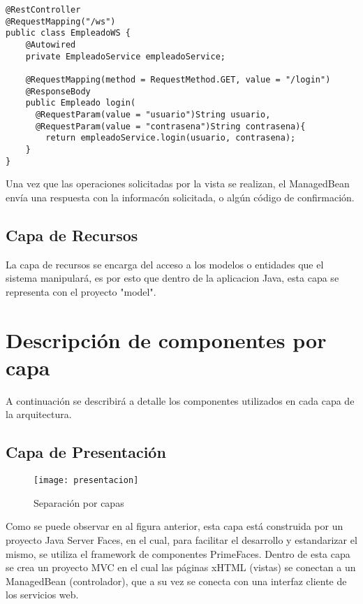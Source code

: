 \begin{lstlisting}
@RestController
@RequestMapping("/ws")
public class EmpleadoWS {
    @Autowired
    private EmpleadoService empleadoService;
    
    @RequestMapping(method = RequestMethod.GET, value = "/login")
    @ResponseBody
    public Empleado login(
      @RequestParam(value = "usuario")String usuario,
      @RequestParam(value = "contrasena")String contrasena){
        return empleadoService.login(usuario, contrasena);
    }
}
\end{lstlisting}
Una vez que las operaciones solicitadas por la vista se realizan, el ManagedBean envía una respuesta con la informacón solicitada, o algún código de confirmación.

\subsection{Capa de Recursos}
La capa de recursos se encarga del acceso a los modelos o entidades que el sistema manipulará, es por esto que dentro de la aplicacion Java, esta capa se representa con el proyecto "model".

\section{Descripción de componentes por capa}

A continuación se describirá a detalle los componentes utilizados en cada capa de la arquitectura.

\subsection{Capa de Presentación}

\begin{figure}[H]
  \begin{center}
    \texttt{[image: presentacion]}
  \end{center}
  \caption{Separación por capas}
\end{figure}

Como se puede observar en al figura anterior, esta capa está construida por un proyecto Java Server Faces, en el cual, para facilitar el desarrollo y estandarizar el mismo, se utiliza el framework de componentes PrimeFaces.
Dentro de esta capa se crea un proyecto MVC en el cual las páginas xHTML (vistas) se conectan a un ManagedBean (controlador), que a su vez se conecta con una interfaz cliente de los servicios web.

